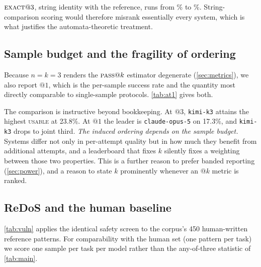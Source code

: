 \documentclass[11pt]{article}
\newcommand{\pass}{\textsc{pass}}
\newcommand{\usable}{\textsc{usable}}
\newcommand{\exact}{\textsc{exact}}
\begin{document}
$\exact{}@3$, string identity with the reference, runs from \exactlo{}\% to \exacthi{}\%.
String-comparison scoring would therefore misrank essentially every system,
which is what justifies the automata-theoretic treatment.

\subsection{Sample budget and the fragility of ordering}
\label{sec:atk}

Because $n=k=3$ renders the $\pass{}@k$ estimator degenerate
(\cref{sec:metrics}), we also report $@1$, which is the per-sample
success rate and the quantity most directly comparable to single-sample
protocols. \cref{tab:at1} gives both.

\begin{table}[htbp]
\centering
\small

\caption{Per-sample ($@1$) against any-of-three ($@3$) estimates, computed
from per-sample success counts. The final column gives the number of tasks
with fewer than three usable samples, which are excluded from that model's
$@3$ estimate. The $@3$ columns agree with \cref{tab:main} to the digit for
all eleven models; they are computed by different routes over the same
exclusion, and \cref{app:hazards} records the estimator defect this check
caught.}
\label{tab:at1}
\end{table}

The comparison is instructive beyond bookkeeping. At $@3$,
\texttt{kimi-k3} attains the highest \usable{} at 23.8\%. At $@1$ the leader
is \texttt{claude-opus-5} on 17.3\%, and \texttt{kimi-k3} drops to joint
third.
\emph{The induced ordering depends on the sample budget.} Systems differ not
only in per-attempt quality but in how much they benefit from additional
attempts, and a leaderboard that fixes $k$ silently fixes a weighting between
those two properties. This is a further reason to prefer banded reporting
(\cref{sec:power}), and a reason to state $k$ prominently whenever an @$k$
metric is ranked.

\subsection{ReDoS and the human baseline}
\label{sec:humanbaseline}

\cref{tab:vuln} applies the identical safety screen to the corpus's 450
human-written reference patterns. For comparability with the human set (one
pattern per task) we score one sample per task per model rather than the
any-of-three statistic of \cref{tab:main}.
\end{document}
